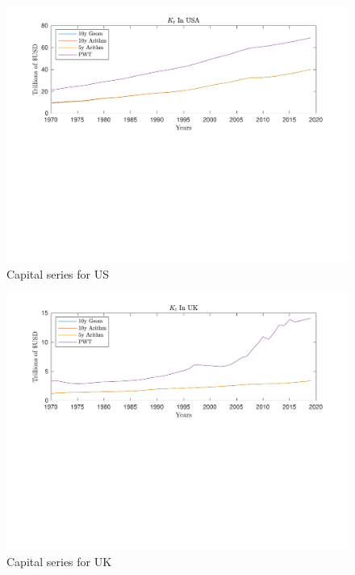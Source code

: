 \documentclass[12pt]{article}
\theoremstyle{mytheoremstyle}
\theoremstyle{mytheoremstyle}
\theoremstyle{myproblemstyle}
\begin{document}
\begin{figure}[htbp]
    \includegraphics[trim = 0in 3.2in 0in 0in, clip, width=1\textwidth]{out/Capital_Series_PWT_US.pdf}
    \caption{Capital series for US}
\end{figure}

\begin{figure}[htbp]
    \includegraphics[trim = 0in 3.2in 0in 0in, clip, width=1\textwidth]{out/Capital_Series_PWT_UK.pdf}
    \caption{Capital series for UK}
\end{figure}
\end{document}
